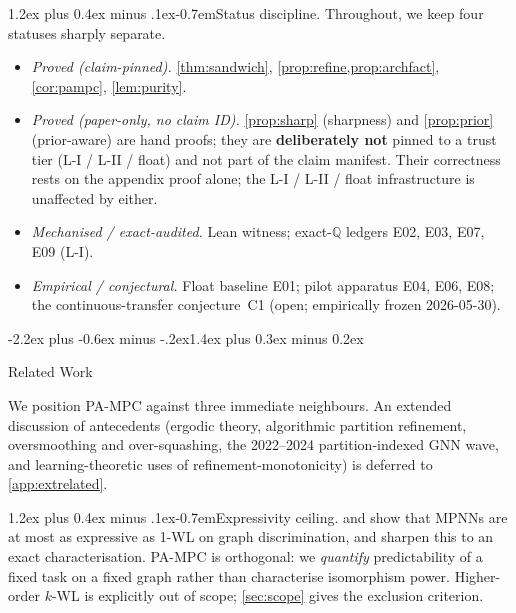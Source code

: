 \documentclass[10pt]{article}
\makeatletter
\def\section{\@startsection{section}{1}{\z@}%
  {-2.2ex plus -0.6ex minus -.2ex}{1.4ex plus 0.3ex minus 0.2ex}%
  {\normalsize\bf\raggedright\sffamily}}
\def\paragraph{\@startsection{paragraph}{4}{\z@}%
  {1.2ex plus 0.4ex minus .1ex}{-0.7em}{\normalsize\bf}}
\theoremstyle{definition}
\theoremstyle{remark}
\makeatother
\begin{document}
\paragraph{Status discipline.}
Throughout, we keep four statuses sharply separate.
\begin{itemize}
  \item \emph{Proved (claim-pinned).} \cref{thm:sandwich},
    \cref{prop:refine,prop:archfact}, \cref{cor:pampc},
    \cref{lem:purity}.
  \item \emph{Proved (paper-only, no claim ID).}
    \cref{prop:sharp} (sharpness) and \cref{prop:prior}
    (prior-aware) are hand proofs; they are \textbf{deliberately
    not} pinned to a trust tier (L-I / L-II / float) and not part
    of the claim manifest. Their correctness rests on the appendix
    proof alone; the L-I / L-II / float infrastructure is unaffected
    by either.
  \item \emph{Mechanised / exact-audited.} Lean witness;
    exact-$\mathbb{Q}$ ledgers E02, E03, E07, E09 (L-I).
  \item \emph{Empirical / conjectural.} Float baseline E01; pilot
    apparatus E04, E06, E08; the continuous-transfer conjecture~C1
    (open; empirically frozen 2026-05-30).
\end{itemize}

\section{Related Work}\label{sec:related}

We position PA-MPC against three immediate neighbours. An extended
discussion of antecedents (ergodic theory, algorithmic partition
refinement, oversmoothing and over-squashing, the 2022--2024
partition-indexed GNN wave, and learning-theoretic uses of
refinement-monotonicity) is deferred to \cref{app:extrelated}.

\paragraph{Expressivity ceiling.}
\citet{xu2019gin} and \citet{morris2019wl} show that MPNNs are at
most as expressive as 1-WL on graph discrimination, and
\citet{azizian2021expressive} sharpen this to an exact
characterisation. PA-MPC is orthogonal: we \emph{quantify}
predictability of a fixed task on a fixed graph rather than
characterise isomorphism power. Higher-order $k$-WL
\citep{morris2020kwl} is explicitly out of scope; \cref{sec:scope}
gives the exclusion criterion.
\end{document}
